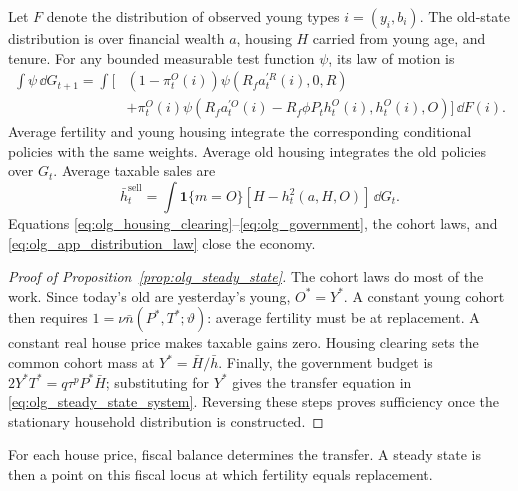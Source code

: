 Let $F$ denote the distribution of observed young types $i=(y_i,b_i)$.  The
old-state distribution is over financial wealth $a$, housing $H$ carried from
young age, and tenure.  For any bounded measurable test function $\psi$, its
law of motion is
\begin{align}
 \int\psi\,\dd G_{t+1}
 =\int\Big[&(1-\pi_t^O(i))
 \psi(R_fa_t^{\prime R}(i),0,R)\nonumber\\[-2pt]
 &+\pi_t^O(i)\psi(R_fa_t^{\prime O}(i)-R_f\phi P_th_t^O(i),h_t^O(i),O)
 \Big]\,\dd F(i).
 \label{eq:olg_app_distribution_law}
\end{align}
Average fertility and young housing integrate the corresponding conditional
policies with the same weights.  Average old housing integrates the old
policies over $G_t$.  Average taxable sales are
\begin{equation}
 \bar h_t^{\mathrm{sell}}=\int\mathbf 1\{m=O\}
 [H-h_t^2(a,H,O)]\,\dd G_t.
 \label{eq:olg_app_old_sales}
\end{equation}
Equations \eqref{eq:olg_housing_clearing}--\eqref{eq:olg_government}, the cohort
laws, and \eqref{eq:olg_app_distribution_law} close the economy.

\begin{proof}[Proof of Proposition~\ref{prop:olg_steady_state}]
The cohort laws do most of the work.  Since today's old are yesterday's young,
$O^*=Y^*$.  A constant young cohort then requires
$1=\nu\bar n(P^*,T^*;\vartheta)$: average fertility must be at replacement.
A constant real house price makes taxable gains zero.  Housing clearing sets
the common cohort mass at $Y^*=\bar H/\bar h$.  Finally, the government budget
is $2Y^*T^*=q\tau^pP^*\bar H$; substituting for $Y^*$ gives the transfer
equation in \eqref{eq:olg_steady_state_system}.  Reversing these steps proves
sufficiency once the stationary household distribution is constructed.
\end{proof}

For each house price, fiscal balance determines the transfer.  A steady state
is then a point on this fiscal locus at which fertility equals replacement.

